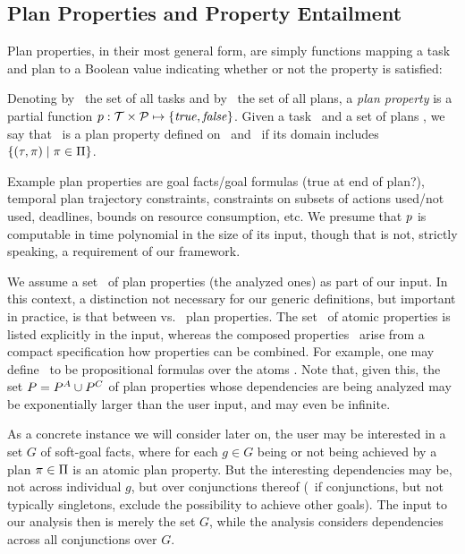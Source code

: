 \subsection{Plan Properties and Property Entailment}

Plan properties, in their most general form, are simply functions
mapping a task and plan to a Boolean value indicating whether or not
the property is satisfied:

\begin{definition}
Denoting by \alltasks\ the set of all tasks and by \allplans\ the set
of all plans, a \emph{plan property} is a partial function $p :
\cal T \times \cal P \mapsto \{\mathit{true}, \mathit{false}\}$. Given a task
\task\ and a set of plans \plans, we say that \prop\ is a plan
property defined on \task\ and \plans\ if its domain includes
$\{(\tau,\pi) \mid \pi \in \Pi\}$.
\end{definition}

Example plan properties are goal facts/goal formulas (true at end of
plan?), temporal plan trajectory constraints, constraints on subsets
of actions used/not used, deadlines, bounds on resource consumption,
etc. We presume that $p$ is computable in time polynomial in the
size of its input, though that is not, strictly speaking, a
requirement of our framework.

We assume a set \props\ of plan properties (the analyzed ones) as part
of our input. In this context, a distinction not necessary for our
generic definitions, but important in practice, is that between
 vs.\  plan properties. The set
\propsatom\ of atomic properties is listed explicitly in the input,
whereas the composed properties \propscomp\ arise from a compact
specification how properties can be combined. For example, one may
define \propscomp\ to be propositional formulas over the atoms
\propsatom. Note that, given this, the set $P = P^A \cup
P^C$ of plan properties whose dependencies are being analyzed
may be exponentially larger than the user input, and may even be
infinite.

As a concrete instance we will consider later on, the user may be
interested in a set $G$ of soft-goal facts, where for each $g \in G$
being or not being achieved by a plan $\pi \in \Pi$ is an atomic
plan property. But the interesting dependencies may be, not across
individual $g$, but over conjunctions thereof (\eg\ if conjunctions,
but not typically singletons, exclude the possibility to achieve other
goals). The input to our analysis then is merely the set $G$, while
the analysis considers dependencies across all conjunctions over $G$.

